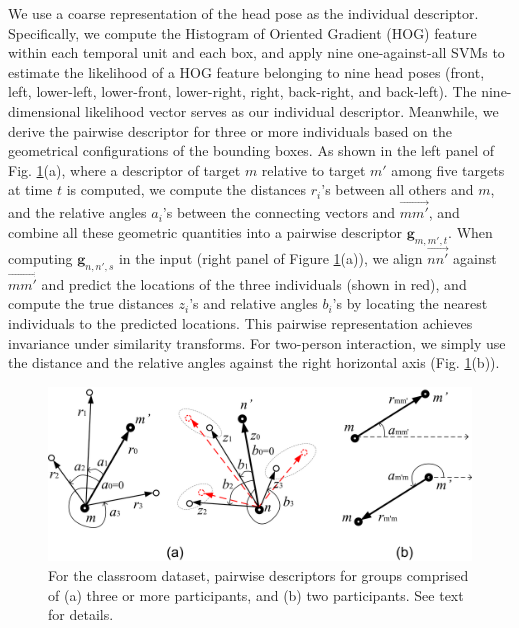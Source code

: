 \documentclass[10pt,twocolumn,letterpaper]{article}
\begin{document}
We use a coarse representation of the head pose as the individual descriptor. Specifically, we compute the Histogram of Oriented Gradient (HOG) feature within each temporal unit and each box, and apply nine one-against-all SVMs to estimate the likelihood of a HOG feature belonging to nine head poses (front, left, lower-left, lower-front, lower-right, right, back-right, and back-left). The nine-dimensional likelihood vector  serves as our individual descriptor. Meanwhile, we derive the pairwise descriptor for three or more individuals based on the geometrical configurations of the bounding boxes. As shown in the left panel of Fig. \ref{context_classroom}(a), where a descriptor of target $m$ relative to target $m'$ among five targets at time $t$ is computed, we compute the distances $r_{i}$'s between all others and $m$, and the relative angles $a_{i}$'s between the connecting vectors and $\overrightarrow{mm'}$, and combine all these geometric quantities into a pairwise descriptor $\mathbf{g}_{m,m',t}$. When computing $\mathbf{g}_{n,n',s}$ in the input (right panel of Figure \ref{context_classroom}(a)), we align $\overrightarrow{nn'}$ against $\overrightarrow{mm'}$ and predict the locations of the three individuals (shown in red), and compute the true distances $z_{i}$'s and relative angles $b_{i}$'s by locating the nearest individuals to the predicted locations. This pairwise representation achieves invariance under similarity transforms. For two-person interaction, we simply use the distance and the relative angles against the right horizontal axis (Fig. \ref{context_classroom}(b)). 

\begin{figure}[t]
\begin{center}
\includegraphics[scale=0.4]{context_classroom.png}
\end{center}
\caption{For the classroom dataset, pairwise descriptors for groups comprised of (a) three or more participants, and (b) two participants. See text for details. }
\label{context_classroom}
\end{figure}
\end{document}
